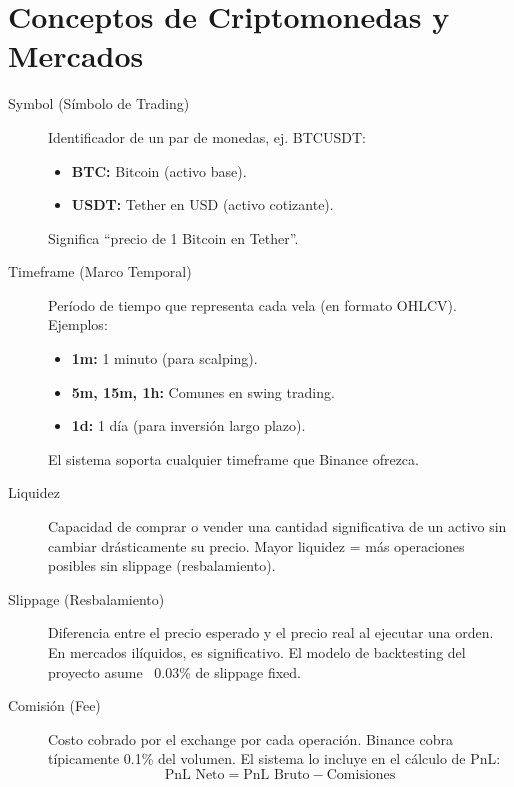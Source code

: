 \section*{Conceptos de Criptomonedas y Mercados}

\begin{description}
    \item[Symbol (Símbolo de Trading)] Identificador de un par de monedas, ej. BTCUSDT:
    \begin{itemize}
        \item \textbf{BTC:} Bitcoin (activo base).
        \item \textbf{USDT:} Tether en USD (activo cotizante).
    \end{itemize}
    Significa ``precio de 1 Bitcoin en Tether''.

    \item[Timeframe (Marco Temporal)] Período de tiempo que representa cada vela (en formato OHLCV). Ejemplos:
    \begin{itemize}
        \item \textbf{1m:} 1 minuto (para scalping).
        \item \textbf{5m, 15m, 1h:} Comunes en swing trading.
        \item \textbf{1d:} 1 día (para inversión largo plazo).
    \end{itemize}
    El sistema soporta cualquier timeframe que Binance ofrezca.

    \item[Liquidez] Capacidad de comprar o vender una cantidad significativa de un activo sin cambiar drásticamente su precio. Mayor liquidez = más operaciones posibles sin slippage (resbalamiento).

    \item[Slippage (Resbalamiento)] Diferencia entre el precio esperado y el precio real al ejecutar una orden. En mercados ilíquidos, es significativo. El modelo de backtesting del proyecto asume ~0.03\% de slippage fixed.

    \item[Comisión (Fee)] Costo cobrado por el exchange por cada operación. Binance cobra típicamente 0.1\% del volumen. El sistema lo incluye en el cálculo de PnL:
    $$\text{PnL Neto} = \text{PnL Bruto} - \text{Comisiones}$$

\end{description}


